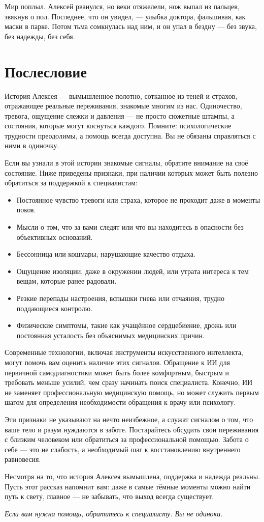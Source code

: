 \documentclass[12pt,a4paper]{book}
\begin{document}
Мир поплыл. Алексей рванулся, но веки отяжелели, нож выпал из пальцев, звякнув о пол. Последнее, что он увидел, — улыбка доктора, фальшивая, как маски в парке. Потом тьма сомкнулась над ним, и он упал в бездну — без звука, без надежды, без себя.

\chapter*{Послесловие}

История Алексея — вымышленное полотно, сотканное из теней и страхов, отражающее реальные переживания, знакомые многим из нас. Одиночество, тревога, ощущение слежки и давления — не просто сюжетные штампы, а состояния, которые могут коснуться каждого. Помните: психологические трудности преодолимы, а помощь всегда доступна. Вы не обязаны справляться с ними в одиночку.

Если вы узнали в этой истории знакомые сигналы, обратите внимание на своё состояние. Ниже приведены признаки, при наличии которых может быть полезно обратиться за поддержкой к специалистам:

\begin{itemize}
    \item Постоянное чувство тревоги или страха, которое не проходит даже в моменты покоя.
    \item Мысли о том, что за вами следят или что вы находитесь в опасности без объективных оснований.
    \item Бессонница или кошмары, нарушающие качество отдыха.
    \item Ощущение изоляции, даже в окружении людей, или утрата интереса к тем вещам, которые ранее радовали.
    \item Резкие перепады настроения, вспышки гнева или отчаяния, трудно поддающиеся контролю.
    \item Физические симптомы, такие как учащённое сердцебиение, дрожь или постоянная усталость без объяснимых медицинских причин.
\end{itemize}

Современные технологии, включая инструменты искусственного интеллекта, могут помочь вам оценить наличие этих сигналов. Обращение к ИИ для первичной самодиагностики может быть более комфортным, быстрым и требовать меньше усилий, чем сразу начинать поиск специалиста. Конечно, ИИ не заменяет профессиональную медицинскую помощь, но может служить первым шагом для определения необходимости обращения к врачу или психологу.

Эти признаки не указывают на нечто неизбежное, а служат сигналом о том, что ваше тело и разум нуждаются в заботе. Постарайтесь обсудить свои переживания с близким человеком или обратиться за профессиональной помощью. Забота о себе — это не слабость, а необходимый шаг к восстановлению внутреннего равновесия.

Несмотря на то, что история Алексея вымышлена, поддержка и надежда реальны. Пусть этот рассказ напомнит вам: даже в самые тёмные моменты можно найти путь к свету, главное — не забывать, что выход всегда существует.

\bigskip
\textit{Если вам нужна помощь, обратитесь к специалисту. Вы не одиноки.}
\end{document}

